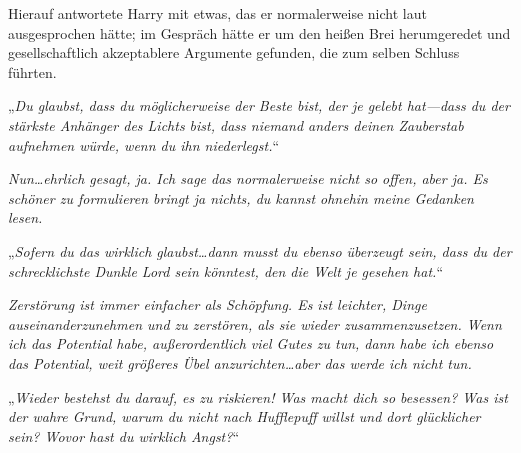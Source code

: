 Hierauf antwortete Harry mit etwas, das er normalerweise nicht laut ausgesprochen hätte; im Gespräch hätte er um den heißen Brei herumgeredet und gesellschaftlich akzeptablere Argumente gefunden, die zum selben Schluss führten.

„\emph{Du glaubst, dass du möglicherweise der Beste bist, der je gelebt hat—dass du der stärkste Anhänger des Lichts bist, dass niemand anders deinen Zauberstab aufnehmen würde, wenn du ihn niederlegst.}“

\emph{Nun…ehrlich gesagt, ja. Ich sage das normalerweise nicht so offen, aber ja. Es schöner zu formulieren bringt ja nichts, du kannst ohnehin meine Gedanken lesen. }

„\emph{Sofern du das wirklich glaubst…dann musst du ebenso überzeugt sein, dass du der schrecklichste Dunkle Lord sein könntest, den die Welt je gesehen hat.}“

\emph{Zerstörung ist immer einfacher als Schöpfung. Es ist leichter, Dinge auseinanderzunehmen und zu zerstören, als sie wieder zusammenzusetzen. Wenn ich das Potential habe, außerordentlich viel Gutes zu tun, dann habe ich ebenso das Potential, weit größeres Übel anzurichten…aber das werde ich nicht tun. }

„\emph{Wieder bestehst du darauf, es zu riskieren! Was macht dich so besessen? Was ist der wahre Grund, warum du nicht nach Hufflepuff willst und dort \emph{glücklicher} sein? Wovor hast du wirklich Angst?}“

